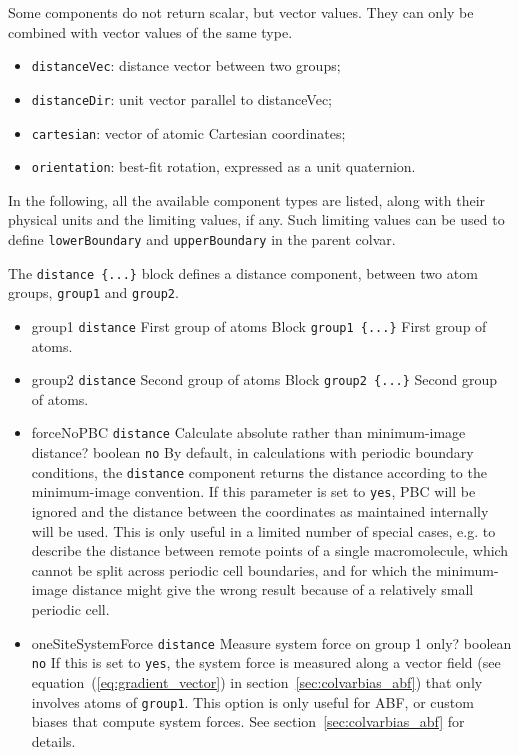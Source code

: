 Some components do not return scalar, but vector values.
They can only be combined with vector values of the same
type.
\begin{itemize}
\item \texttt{distanceVec}: distance vector between two groups;
\item \texttt{distanceDir}: unit vector parallel to distanceVec;
\item \texttt{cartesian}: vector of atomic Cartesian coordinates;
\item \texttt{orientation}: best-fit rotation, expressed as a unit quaternion.
\end{itemize}
  
In the following, all the available component types are listed, along
with their physical units and the limiting values, if any.  Such
limiting values can be used to define \texttt{lowerBoundary} and
\texttt{upperBoundary} in the parent colvar.



The \texttt{distance \{...\}} block defines a distance component,
between two atom groups, \texttt{group1} and \texttt{group2}.
\begin{itemize}
\item %
  \key
    {group1}{%
    \texttt{distance}}{%
    First group of atoms}{%
    Block \texttt{group1 \{...\}}}{%
    First group of atoms.}
\item %
  \key
    {group2}{%
    \texttt{distance}}{%
    Second group of atoms}{%
    Block \texttt{group2 \{...\}}}{%
    Second group of atoms.}
\item %
  \keydef
    {forceNoPBC}{%
    \texttt{distance}}{%
    Calculate absolute rather than minimum-image distance?}{%
    boolean}{%
    \texttt{no}}{%
    By default, in calculations with periodic boundary conditions, the
    \texttt{distance} component returns the distance according to the
    minimum-image convention. If this parameter is set to \texttt{yes},
    PBC will be ignored and the distance between the coordinates as maintained
    internally will be used. This is only useful in a limited number of
    special cases, e.g. to describe the distance between remote points
    of a single macromolecule, which cannot be split across periodic cell
    boundaries, and for which the minimum-image distance might give the
    wrong result because of a relatively small periodic cell.}
\item %
  \keydef
    {oneSiteSystemForce}{%
    \texttt{distance}}{%
    Measure system force on group 1 only?}{%
    boolean}{%
    \texttt{no}}{%
    If this is set to \texttt{yes}, the system force is measured along
    a vector field (see equation~(\ref{eq:gradient_vector}) in
    section~\ref{sec:colvarbias_abf}) that only involves atoms of
    \texttt{group1}.  This option is only useful for ABF, or custom
    biases that compute system forces.  See
    section~\ref{sec:colvarbias_abf} for details.}
\end{itemize}

